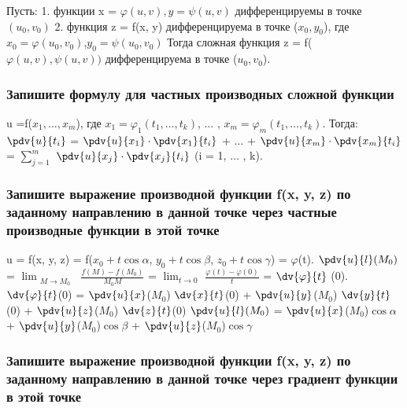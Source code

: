 \documentclass[a4paper, 12pt]{article}
\renewcommand{\phi}{\varphi}
\def\newline{}%
\begin{document}
            Пусть:\newline
            1. функции x = $\phi(u, v), y = \psi(u, v)$ дифференцируемы в точке
            $(u_0, v_0)$\newline
            2. функция z = f(x, y) дифференцируема в точке ($x_0, y_0$), где
            $x_0 = \phi(u_0, v_0)$,\newline $y_0 = \psi(u_0, v_0)$\newline
            Тогда сложная функция z = f($\phi(u, v), \psi(u, v))$ дифференцируема
            в точке ($u_0, v_0$).

            \subsubsection{Запишите формулу для частных производных сложной функции}

            u =f($x_1, \ldots, x_m$), где $x_1 = {\phi}_1(t_1, \ldots, t_k)$,
            $\ldots$ , $x_m = {\phi}_m(t_1, \ldots, t_k)$. Тогда:\newline
            $\pdv{u}{t_i}$ = $\pdv{u}{x_1}\cdot \pdv{x_1}{t_i}$ + $\ldots$ +
            $\pdv{u}{x_m}\cdot \pdv{x_m}{t_i}$ = $\sum\limits_{j = 1}^{m}$
            $\pdv{u}{x_j}\cdot \pdv{x_j}{t_i}$ (i = 1, $\ldots$ , k).

            \subsubsection{Запишите выражение производной функции f(x, y, z) по заданному направлению в данной точке через частные производные функции в этой точке}

            u = f(x, y, z) = f($x_0 + t\cos \alpha$, $y_0 + t\cos \beta$, $z_0 + t\cos \gamma$)
            = $\phi$(t).\newline
            $\pdv{u}{l} (M_0)$ = $\displaystyle{\lim_{\substack{M \rightarrow M_0}}}$
            $\frac{f(M) - f(M_0)}{M_0M}$ = $\displaystyle{\lim_{t \rightarrow 0}}$
            $\frac{\phi(t) - \phi(0)}{t}$ = $\dv{\phi}{t}$ (0).\newline
            $\dv{\phi}{t}$(0) = $\pdv{u}{x}$($M_0$) $\dv{x}{t}$(0) + 
            $\pdv{u}{y}$($M_0$) $\dv{y}{t}$(0) + $\pdv{u}{z}$($M_0$) $\dv{z}{t}$(0)\newline
            $\pdv{u}{l} (M_0)$ = $\pdv{u}{x}$($M_0$)$\cos \alpha$ + 
            $\pdv{u}{y}$($M_0$)$\cos \beta$ + $\pdv{u}{z}$($M_0$)$\cos \gamma$

            \subsubsection{Запишите выражение производной функции f(x, y, z) по заданному направлению в данной точке через градиент функции в этой точке}
\end{document}

